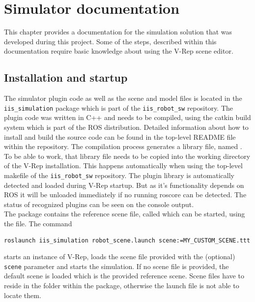 
\chapter{Simulator documentation}

This chapter provides a documentation for the simulation solution that was developed during this project. 
Some of the steps, described within this documentation require basic knowledge about using the V-Rep scene editor.


\section{Installation and startup}

The simulator plugin code as well as the scene and model files is located in the \texttt{iis\_simulation} package which is part of the \texttt{iis\_robot\_sw} repository. The plugin code was written in C++ and needs to be compiled, using the catkin build system which is part of the ROS distribution. Detailed information about how to install and build the source code can be found in the top-level README file within the repository. The compilation process generates a library file, named . To be able to work, that library file needs to be copied into the working directory of the V-Rep installation. This happens automatically when using the top-level makefile of the \texttt{iis\_robot\_sw} repository. The plugin library is automatically detected and loaded during V-Rep startup. But as it's functionality depends on ROS it will be unloaded immediately if no running roscore can be detected. The status of recognized plugins can be seen on the console output. \\

The package contains the reference scene file, called  which can be started, using the  file. The command
\begin{verbatim}
roslaunch iis_simulation robot_scene.launch scene:=MY_CUSTOM_SCENE.ttt
\end{verbatim}
starts an instance of V-Rep, loads the scene file provided with the (optional) \texttt{scene} parameter and starts the simulation. If no scene file is provided, the default scene is loaded which is the provided reference scene. Scene files have to reside in the  folder within the package, otherwise the launch file is not able to locate them.

